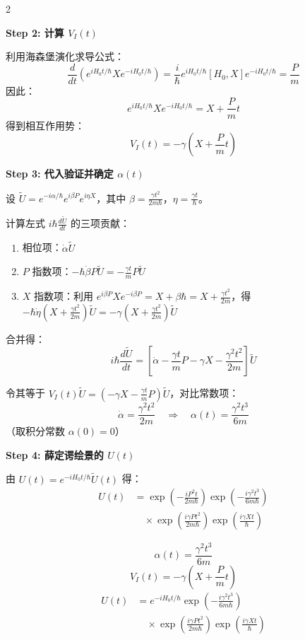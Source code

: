 \begin{multicols}{2}
\begin{derivationbox}[标准解题过程]
\textbf{Step 2: 计算 $V_I(t)$}

利用海森堡演化求导公式：
\[
\frac{d}{dt}\left( e^{iH_0 t/\hbar} X e^{-iH_0 t/\hbar} \right) = \frac{i}{\hbar} e^{iH_0 t/\hbar} [H_0, X] e^{-iH_0 t/\hbar} = \frac{P}{m}
\]
因此：
\[
e^{iH_0 t/\hbar} X e^{-iH_0 t/\hbar} = X + \frac{P}{m}t
\]
得到相互作用势：
\[
V_I(t) = -\gamma \left( X + \frac{P}{m}t \right)
\]

\textbf{Step 3: 代入验证并确定 $\alpha(t)$}

设 $\tilde{U} = e^{-i\alpha/\hbar} e^{i\beta P} e^{i\eta X}$，其中 $\beta = \frac{\gamma t^2}{2m\hbar}$，$\eta = \frac{\gamma t}{\hbar}$。

计算左式 $i\hbar \frac{d\tilde{U}}{dt}$ 的三项贡献：
\begin{enumerate}[nosep]
    \item 相位项：$\dot{\alpha} \tilde{U}$
    \item $P$ 指数项：$-\hbar\dot{\beta} P \tilde{U} = -\frac{\gamma t}{m} P \tilde{U}$
    \item $X$ 指数项：利用 $e^{i\beta P} X e^{-i\beta P} = X + \beta\hbar = X + \frac{\gamma t^2}{2m}$，得 $-\hbar\dot{\eta}(X + \frac{\gamma t^2}{2m})\tilde{U} = -\gamma(X + \frac{\gamma t^2}{2m})\tilde{U}$
\end{enumerate}

合并得：
\[
i\hbar \frac{d\tilde{U}}{dt} = \left[ \dot{\alpha} - \frac{\gamma t}{m}P - \gamma X - \frac{\gamma^2 t^2}{2m} \right] \tilde{U}
\]

令其等于 $V_I(t)\tilde{U} = (-\gamma X - \frac{\gamma t}{m}P)\tilde{U}$，对比常数项：
\[
\dot{\alpha} = \frac{\gamma^2 t^2}{2m} \quad \Rightarrow \quad \alpha(t) = \frac{\gamma^2 t^3}{6m}
\]
（取积分常数 $\alpha(0) = 0$）

\textbf{Step 4: 薛定谔绘景的 $U(t)$}

由 $U(t) = e^{-iH_0 t/\hbar} \tilde{U}(t)$ 得：
\[
\begin{aligned}
U(t) &= \exp\left( -\frac{iP^2 t}{2m\hbar} \right) \exp\left( -\frac{i\gamma^2 t^3}{6m\hbar} \right) \\
&\quad \times \exp\left( \frac{i\gamma P t^2}{2m\hbar} \right) \exp\left( \frac{i\gamma X t}{\hbar} \right)
\end{aligned}
\]
\end{derivationbox}

\begin{formulabox}[核心结论]
\[
\alpha(t) = \frac{\gamma^2 t^3}{6m}
\]
\[
V_I(t) = -\gamma \left( X + \frac{P}{m}t \right)
\]
\[
\begin{aligned}
U(t) &= e^{-iH_0 t/\hbar} \exp\left( -\frac{i\gamma^2 t^3}{6m\hbar} \right) \\
&\quad \times \exp\left( \frac{i\gamma P t^2}{2m\hbar} \right) \exp\left( \frac{i\gamma X t}{\hbar} \right)
\end{aligned}
\]
\end{formulabox}


\end{multicols}

